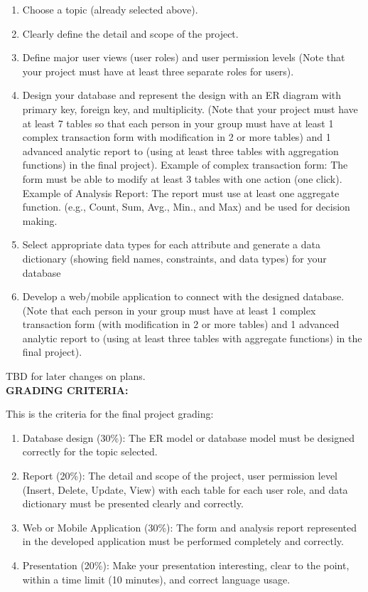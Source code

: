 \begin{enumerate}
	\item Choose a topic (already selected above).
	\item Clearly define the detail and scope of the project.
	\item Define major user views (user roles) and user permission levels (Note that your project must have at least three separate roles for users).
	\item Design your database and represent the design with an ER diagram with primary key, foreign key, and multiplicity. (Note that your project must have at least 7 tables so that each person in your group must have at least 1 complex transaction form with modification in 2 or more tables) and 1 advanced analytic report to (using at least three tables with aggregation functions) in the final project).
		\subitem Example of complex transaction form: The form must be able to modify at least 3 tables with one action (one click).
		\subitem Example of Analysis Report: The report must use at least one aggregate function. (e.g., Count, Sum, Avg., Min., and Max) and be used for decision making.
	\item Select appropriate data types for each attribute and generate a data dictionary (showing field names, constraints, and data types) for your database
	\item Develop a web/mobile application to connect with the designed database. (Note that each person in your group must have at least 1 complex transaction form (with modification in 2 or more tables) and 1 advanced analytic report to (using at least three tables with aggregate functions) in the final project).
\end{enumerate}

TBD for later changes on plans.\\

\textbf{GRADING CRITERIA:} 

This is the criteria for the final project grading: 

\begin{enumerate}
	\item Database design (30\%): The ER model or database model must be designed correctly for the topic selected. 
	\item Report (20\%): The detail and scope of the project, user permission level (Insert, Delete, Update, View) with each table for each user role, and data dictionary must be presented clearly and correctly.
	\item Web or Mobile Application (30\%): The form and analysis report represented in the developed application must be performed completely and correctly. 
	\item Presentation (20\%): Make your presentation interesting, clear to the point, within a time limit (10 minutes), and correct language usage.
\end{enumerate}

\
